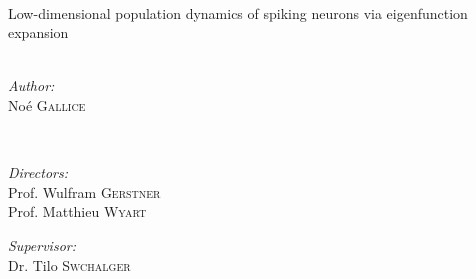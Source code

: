 \documentclass[a4paper,11pt,twoside]{article}
\numberwithin{equation}{section}
\begin{document}
\begin{titlepage}

\vspace*{1\baselineskip}
\HRule \\[0.7cm]
{ \huge Low-dimensional population dynamics of spiking neurons via eigenfunction expansion}
\\[0.4cm] %
\HRule \\[1.5cm]
 

\begin{minipage}{0.4\textwidth}
\begin{flushleft} \large
\textit{Author:}\\
Noé \textsc{Gallice} %
\end{flushleft}
\end{minipage}
~
\begin{minipage}{0.4\textwidth}
\begin{flushleft} \large
\textit{Directors:} \\
Prof. Wulfram \textsc{Gerstner} \\
Prof. Matthieu \textsc{Wyart} \vspace{0.5cm}

\textit{Supervisor:} \\
Dr. Tilo \textsc{Swchalger}  \\
\end{flushleft}
\end{minipage}\\[4cm]




\baselineskip=14pt
\parindent=12pt
\parskip=2pt
\vspace*{10\baselineskip}
\renewcommand{\abstractname}{Abstract}
\begin{abstract} 
{\normalsize
TODO }
\end{abstract}

\end{titlepage}
\end{document}
